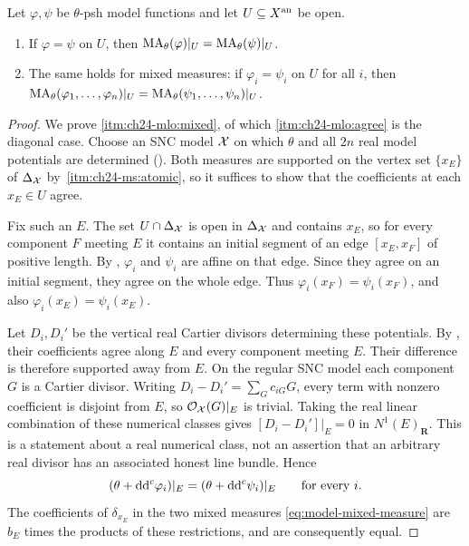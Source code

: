 \begin{corollary}
\label{cor:ch24-model-locality-open}
Let \(\varphi,\psi\) be \(\theta\)-psh model functions and let
\(U\subseteq X^{\mathrm{an}}\) be open.
\begin{enumerate}
\item\label{itm:ch24-mlo:agree} If \(\varphi=\psi\) on \(U\), then
 \(\operatorname{MA}_\theta(\varphi)|_U=\operatorname{MA}_\theta(\psi)|_U\).
\item\label{itm:ch24-mlo:mixed} The same holds for mixed measures: if
 \(\varphi_i=\psi_i\) on \(U\) for all \(i\), then
 \(\operatorname{MA}_\theta(\varphi_1,\ldots,\varphi_n)|_U
   =\operatorname{MA}_\theta(\psi_1,\ldots,\psi_n)|_U\).
\end{enumerate}
\end{corollary}

\begin{proof}
We prove \cref{itm:ch24-mlo:mixed}, of which \cref{itm:ch24-mlo:agree} is the
diagonal case.  Choose an SNC model \(\mathcal X\) on which \(\theta\) and all
\(2n\) real model potentials are determined ().
Both measures are supported on the vertex set \(\{x_E\}\) of
\(\Delta_{\mathcal X}\) by
\,\cref{itm:ch24-ms:atomic}, so it suffices
to show that the coefficients at each \(x_E\in U\) agree.

Fix such an \(E\).  The set \(U\cap\Delta_{\mathcal X}\) is open in
\(\Delta_{\mathcal X}\) and contains \(x_E\), so for every component \(F\)
meeting \(E\) it contains an initial segment of an edge
\([x_E,x_F]\) of positive length.  By
, \(\varphi_i\) and \(\psi_i\) are
affine on that edge.  Since they agree on an initial segment, they agree
on the whole edge.  Thus \(\varphi_i(x_F)=\psi_i(x_F)\), and also
\(\varphi_i(x_E)=\psi_i(x_E)\).

Let \(D_i,D_i'\) be the vertical real Cartier divisors determining these
potentials.  By , their
coefficients agree along \(E\) and every component meeting \(E\).
Their difference is therefore supported away from \(E\).  On the
regular SNC model each component \(G\) is a Cartier divisor.  Writing
\(D_i-D_i'=\sum_G c_{iG}G\), every term with nonzero coefficient is
disjoint from \(E\), so \(\mathcal O_{\mathcal X}(G)|_E\) is trivial.  Taking the
real linear combination of these numerical classes gives
\([D_i-D_i']|_E=0\) in \(N^1(E)_{\mathbf R}\).  This is a statement
about a real numerical class, not an assertion that an arbitrary real
divisor has an associated honest line bundle.  Hence
\[
 (\theta+\mathrm d\mathrm d^c\varphi_i)|_E=(\theta+\mathrm d\mathrm d^c\psi_i)|_E
 \qquad\text{for every }i.
\]
The coefficients of \(\delta_{x_E}\) in the two mixed measures
\eqref{eq:model-mixed-measure} are \(b_E\) times the products of these
restrictions, and are consequently equal.
\end{proof}
